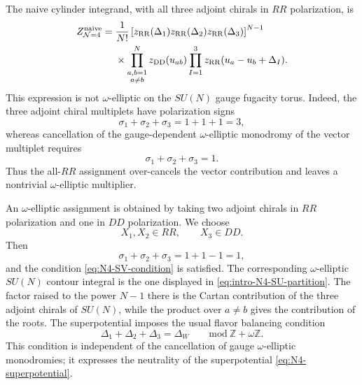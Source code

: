 \documentclass[11pt,a4paper]{article}
\numberwithin{equation}{section}
\theoremstyle{plain}
\theoremstyle{definition}
\theoremstyle{remark}
\begin{document}
The naive cylinder integrand, with all three adjoint chirals in \(RR\) polarization,
is
\begin{align}
Z_{\mathcal N=4}^{\rm naive}
={}&
\frac{1}{N!}
\left[
z_{\rm RR}(\Delta_1)
z_{\rm RR}(\Delta_2)
z_{\rm RR}(\Delta_3)
\right]^{N-1}
\nonumber\\
&\times
\prod_{\substack{a,b=1\\a\neq b}}^{N}
z_{\rm DD}(u_{ab})
\prod_{I=1}^{3}
z_{\rm RR}(u_a-u_b+\Delta_I).
\label{eq:N4-naive-all-RR}
\end{align}
This expression is not \(\omega\)-elliptic on the \(SU(N)\) gauge fugacity torus.  Indeed, the
three adjoint chiral multiplets have polarization signs
\begin{equation}
\sigma_1+\sigma_2+\sigma_3=1+1+1=3,
\end{equation}
whereas cancellation of the gauge-dependent \(\omega\)-elliptic monodromy of the vector multiplet
requires
\begin{equation}
\sigma_1+\sigma_2+\sigma_3=1.
\label{eq:N4-SV-condition}
\end{equation}
Thus the all-\(RR\) assignment over-cancels the vector contribution and leaves a
nontrivial \(\omega\)-elliptic multiplier.

An \(\omega\)-elliptic assignment is obtained by taking two adjoint chirals in \(RR\)
polarization and one in \(DD\) polarization.  We choose
\begin{equation}
X_1,X_2\in RR,
\qquad
X_3\in DD.
\label{eq:N4-RRDD-polarization}
\end{equation}
Then
\begin{equation}
\sigma_1+\sigma_2+\sigma_3=1+1-1=1,
\end{equation}
and the condition \eqref{eq:N4-SV-condition} is satisfied.  The corresponding
\(\omega\)-elliptic \(SU(N)\) contour integral is the one displayed in
\eqref{eq:intro-N4-SU-partition}.  The factor raised to the power \(N-1\)
there is the Cartan contribution of the three adjoint chirals of \(SU(N)\), while
the product over \(a\neq b\) gives the contribution of the roots.  The
superpotential imposes the usual flavor balancing condition
\begin{equation}
\Delta_1+\Delta_2+\Delta_3=\Delta_W
\qquad
\mathrm{mod}\ \mathbb Z+\omega\mathbb Z.
\label{eq:N4-superpotential-balancing}
\end{equation}
This condition is independent of the cancellation of gauge \(\omega\)-elliptic
monodromies; it expresses the neutrality of the superpotential
\eqref{eq:N4-superpotential}.
\end{document}
